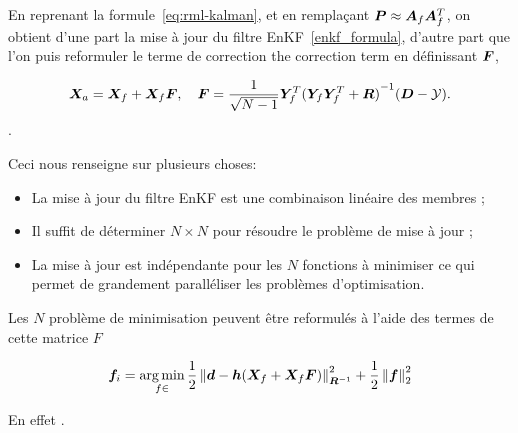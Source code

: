 En reprenant la formule~\ref{eq:rml-kalman}, et en remplaçant $\bm P \approx \bm A_f \bm A_f^T$, on obtient d'une part la mise à jour du filtre EnKF~\ref{enkf_formula}, d'autre part que l'on puis reformuler le terme de correction the correction term en définissant $\bm{F}$,

\begin{equation}
    \bm{X}_a = \bm{X}_f + \bm{X}_f \bm{F}, \quad \bm{F} = \frac{1}{\sqrt{N-1}} \bm Y_f^T {(\bm Y_f \bm Y_f^T + \bm R)}^{-1}(\bm{D} - \mathcal{Y}).
\end{equation}.

Ceci nous renseigne sur plusieurs choses:
\begin{itemize}
    \item La mise à jour du filtre EnKF est une combinaison linéaire des membres ;
    \item Il suffit de déterminer $N \times N$ pour résoudre le problème de mise à jour ;
    \item La mise à jour est indépendante pour les $N$ fonctions à minimiser ce qui permet de grandement paralléliser les problèmes d'optimisation.
\end{itemize}

Les $N$ problème de minimisation peuvent être reformulés à l'aide des termes de cette matrice $F$

\begin{equation*}
    \bm f_i = \operatorname*{arg\,min}_{f \in } \frac12 \left\lVert \bm d - \bm h(\bm{X}_f + \bm{X}_f \bm{F}) \right\rVert^2_{\bm R^{-1}} + \frac12 \left\lVert \bm f \right\rVert_2^2
\end{equation*}

En effet .

